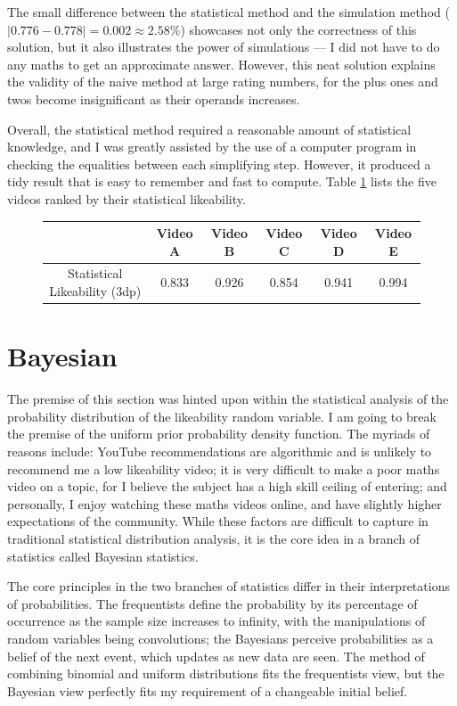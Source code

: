 \documentclass[a4paper,11pt]{article}
\begin{document}
The small difference between the statistical method and the simulation method ($|0.776 - 0.778| = 0.002 \approx 2.58\%$) showcases not only the correctness of this solution, but it also illustrates the power of simulations --- I did not have to do any maths to get an approximate answer. However, this neat solution explains the validity of the naive method at large rating numbers, for the plus ones and twos become insignificant as their operands increases.

Overall, the statistical method required a reasonable amount of statistical knowledge, and I was greatly assisted by the use of a computer program in checking the equalities between each simplifying step. However, it produced a tidy result that is easy to remember and fast to compute. Table \ref{tbl:stat} lists the five videos ranked by their statistical likeability.

\begin{figure}[H]
    \centering
    \begin{tabular}{c|c|c|c|c|c}
        & Video A & Video B & Video C & Video D & Video E \\
        \hline
        \hline
        Statistical Likeability (3dp) & 0.833 & 0.926 & 0.854 & 0.941 & 0.994
    \end{tabular}
    \label{tbl:stat}
\end{figure}

\section{Bayesian}

The premise of this section was hinted upon within the statistical analysis of the probability distribution of the likeability random variable. I am going to break the premise of the uniform prior probability density function. The myriads of reasons include: YouTube recommendations are algorithmic and is unlikely to recommend me a low likeability video; it is very difficult to make a poor maths video on a topic, for I believe the subject has a high skill ceiling of entering; and personally, I enjoy watching these maths videos online, and have slightly higher expectations of the community. While these factors are difficult to capture in traditional statistical distribution analysis, it is the core idea in a branch of statistics called Bayesian statistics.

The core principles in the two branches of statistics differ in their interpretations of probabilities. The frequentists define the probability by its percentage of occurrence as the sample size increases to infinity, with the manipulations of random variables being convolutions; the Bayesians perceive probabilities as a belief of the next event, which updates as new data are seen. The method of combining binomial and uniform distributions fits the frequentists view, but the Bayesian view perfectly fits my requirement of a changeable initial belief.
\end{document}
